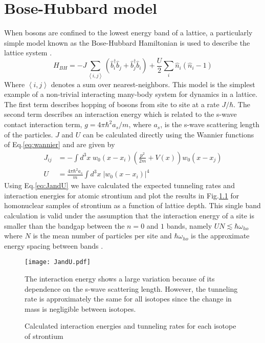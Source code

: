 \chapter{Bose-Hubbard model} \label{app:bhModel}
When bosons are confined to the lowest energy band of a lattice, a particularly simple model known as the Bose-Hubbard Hamiltonian is used to describe the lattice system \cite{Jaksch1998}. 
	\begin{equation} \label{eq:boseHubbard}
		 H_{BH} = -J \sum_{\left< i,j \right>} \left(\hat{b}^{\dagger}_i \hat{b}_j + \hat{b}^{\dagger}_j \hat{b}_i \right)
		 		  + \frac{U}{2} \sum_i \hat{n}_i(\hat{n}_i - 1)
	\end{equation}
Where $\left< i,j \right>$ denotes a sum over nearest-neighbors. This model is the simplest example of a non-trivial interacting many-body system for dynamics in a lattice. The first term describes hopping of bosons from site to site at a rate $J/ \hbar$. The second term describes an interaction energy which is related to the s-wave contact interaction term, $g = 4 \pi \hbar^2 a_s/m$, where $a_s$, is the s-wave scattering length of the particles. $J$ and $U$ can be calculated directly using the Wannier functions of Eq.\;\ref{eq:wannier} and are given by \cite{Jaksch2005}
	\begin{equation} \label{eq:JandU}
	\begin{aligned}
		 J_{ij} &= - \int d^3x \; w_0(x-x_i) \left( \frac{p^2}{2m}+V(x) \right) w_0(x-x_j)\\
		 U &= \frac{4 \pi \hbar^2 a_s}{m} \int d^3x \; \left| w_0(x-x_i)\right|^4
	\end{aligned}
	\end{equation}
Using Eq.\;\ref{eq:JandU} we have calculated the expected tunneling rates and interaction energies for atomic strontium and plot the results in Fig.\;\ref{fig:fig_JandU} for homonuclear samples of strontium as a function of lattice depth. This single band calculation is valid under the assumption that the interaction energy of a site is smaller than the bandgap between the $n= 0$ and $1$ bands, namely $U N \lesssim \hbar \omega_{ho}$ where $N$ is the mean number of particles per site and $\hbar \omega_{ho}$ is the approximate energy spacing between bands \cite{Rey2004}. 


\begin{figure} \label{fig:fig_JandU}
	\centerline{
	\texttt{[image: JandU.pdf]}}
	\caption{Calculated interaction energies and tunneling rates for each isotope of strontium}{The interaction energy shows a large variation because of its dependence on the s-wave scattering length. However, the tunneling rate is approximately the same for all isotopes since the change in mass is negligible between isotopes.}
\end{figure}
	
